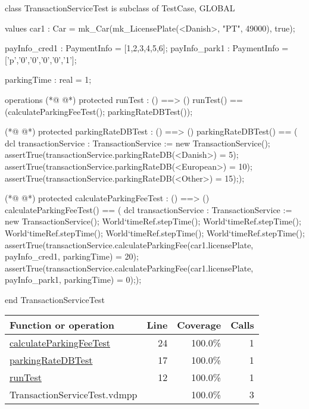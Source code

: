 \begin{vdmpp}[breaklines=true]
class TransactionServiceTest is subclass of TestCase, GLOBAL

values
car1 : Car = mk_Car(mk_LicensePlate(<Danish>, "PT", 49000), true); 

payInfo_cred1 : PaymentInfo = [1,2,3,4,5,6];
payInfo_park1 : PaymentInfo = ['p','0','0','0','0','1'];

parkingTime : real = 1;

operations
(*@
\label{runTest:12}
@*)
protected runTest : () ==> ()
runTest() == 
 (calculateParkingFeeTest();
  parkingRateDBTest());
 
(*@
\label{parkingRateDBTest:17}
@*)
protected parkingRateDBTest : () ==> ()
parkingRateDBTest() == (
 dcl transactionService : TransactionService := new TransactionService();
 assertTrue(transactionService.parkingRateDB(<Danish>) = 5);
 assertTrue(transactionService.parkingRateDB(<European>) = 10);
 assertTrue(transactionService.parkingRateDB(<Other>) = 15););

(*@
\label{calculateParkingFeeTest:24}
@*)
protected calculateParkingFeeTest : () ==> ()
calculateParkingFeeTest() == (
 dcl transactionService : TransactionService := new TransactionService();
 World`timeRef.stepTime();
 World`timeRef.stepTime();
 World`timeRef.stepTime();
 World`timeRef.stepTime();
 World`timeRef.stepTime();
 assertTrue(transactionService.calculateParkingFee(car1.licensePlate, payInfo_cred1, parkingTime) = 20);
 assertTrue(transactionService.calculateParkingFee(car1.licensePlate, payInfo_park1, parkingTime) = 0););



end TransactionServiceTest

\end{vdmpp}
\bigskip
\begin{longtable}{|l|r|r|r|}
\hline
Function or operation & Line & Coverage & Calls \\
\hline
\hline
\hyperref[calculateParkingFeeTest:24]{calculateParkingFeeTest} & 24&100.0\% & 1 \\
\hline
\hyperref[parkingRateDBTest:17]{parkingRateDBTest} & 17&100.0\% & 1 \\
\hline
\hyperref[runTest:12]{runTest} & 12&100.0\% & 1 \\
\hline
\hline
TransactionServiceTest.vdmpp & & 100.0\% & 3 \\
\hline
\end{longtable}

